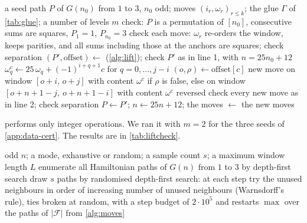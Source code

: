 \begin{algorithm}[h]
\caption{Verification of \cref{thm:main} for given seeds}\label{alg:certificate}
\begin{algorithmic}[1]
\Require a seed path $P$ of $G(n_0)$ from $1$ to $3$, $n_0$ odd; moves $(i_r,\omega_r)_{r\le k}$; the glue $\Gamma$ of \cref{tab:glue}; a number of levels $m$
\State check: $P$ is a permutation of $[n_0]$, consecutive sums are squares, $P_1=1$, $P_{n_0}=3$
\State check each move: $\omega_r$ re-orders the window, keeps parities, and all sums including those at the anchors are squares; check separation
  \State $(P',\mathrm{offset})\gets$  (\cref{alg:lift}); check $P'$ as in line 1, with $n=25n_0+12$
     \State $\omega^c_q\gets25\,\omega_q+(-1)^{i+q+1}c$ for $q=0,\dots,j-i$ 
     \State $(o,\rho)\gets\mathrm{offset}[c]$ 
     \State new move on window $[o+i,\,o+j]$ with content $\omega^c$ if $\rho$ is false,
     \State \hspace{1.2em} else on window $[o+n+1-j,\ o+n+1-i]$ with content $\omega^c$ reversed
  \EndFor
  \State check every new move as in line 2; check separation
  \State $P\gets P'$; $n\gets25n+12$; the moves $\gets$ the new moves
\EndFor
\end{algorithmic}
\end{algorithm}

 performs only integer operations. We ran it with $m=2$ for the three
seeds of \cref{app:data-cert}. The results are in \cref{tab:liftcheck}.

\begin{algorithm}[h]
\caption{Seed search}\label{alg:seeds}
\begin{algorithmic}[1]
\Require odd $n$; a mode, exhaustive or random; a sample count $s$; a maximum window length $L$
  \State enumerate all Hamiltonian paths of $G(n)$ from $1$ to $3$ by depth-first search
\Else
  \State draw $s$ paths by randomised depth-first search: at each step try the unused neighbours in order
  \State \hspace{1.2em} of increasing number of unused neighbours (Warnsdorff's rule), ties broken at random,
  \State \hspace{1.2em} with a step budget of $2\cdot10^5$ and restarts
\EndIf
\State \Return $\max$ over the paths of $|\mathcal F|$ from \cref{alg:moves}
\end{algorithmic}
\end{algorithm}

